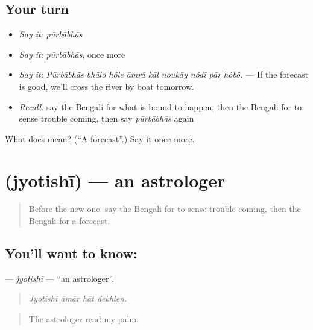 \subsection*{Your turn}
\begin{itemize}
\raggedright
  \item \emph{Say it:} \emph{pūrbābhās}
  \item \emph{Say it:} \emph{pūrbābhās}, once more
  \item \emph{Say it:} \emph{Pūrbābhās bhālo hôle āmrā kāl noukāy nôdī pār hôbô.} — If the forecast is good, we'll cross the river by boat tomorrow.
  \item \emph{Recall:} say the Bengali for what is bound to happen, then the Bengali for to sense trouble coming, then say \emph{pūrbābhās} again
\end{itemize}

\begin{tcolorbox}[breakable,colback=teal!4,colframe=teal!35!black,title={Before you move on}]
What does  mean? (\textquotedblleft{}A forecast\textquotedblright{}.) Say it once more.
\end{tcolorbox}
\section[\texorpdfstring{\bn{জ্যোতিষী} (jyotishī)}{জ্যোতিষী (jyotishī)}]{ (jyotishī) — an astrologer}

\label{lesson:BN-C532-jyotishi}



\begin{quote}
Before the new one: say the Bengali for to sense trouble coming, then the Bengali for a forecast.
\end{quote}

\subsection*{You'll want to know: }
\textbf{} — \emph{jyotishī} — \textquotedblleft{}an astrologer\textquotedblright{}.

\begin{quote}
   
\end{quote}

\begin{quote}
\emph{Jyotishī āmār hāt dekhlen.}
\end{quote}

\begin{quote}
The astrologer read my palm.
\end{quote}

